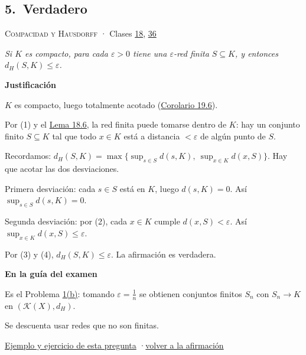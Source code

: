 \documentclass[11pt,a4paper]{article}
\providecommand{\lt}{<}\providecommand{\gt}{>}
\newcommand{\bloque}[1]{\par\smallskip\noindent\textbf{\color{acento}#1}\par}
\begin{document}
\subsection*{\hypertarget{r-5}{}5.\ \textcolor{ok}{Verdadero}}
{\small \textsc{Compacidad y Hausdorff} · Clases \href{https://decostruttivismo.github.io/MAT2514-repaso/pdf/MAT2514_apuntes_completos.pdf\#nameddest=section.18}{18}, \href{https://decostruttivismo.github.io/MAT2514-repaso/pdf/MAT2514_apuntes_completos.pdf\#nameddest=section.36}{36}}\par
\emph{Si $K$ es compacto, para cada $\varepsilon\gt 0$ tiene una $\varepsilon$-red finita $S\subseteq K$, y entonces $d_H(S,K)\le\varepsilon$.}
\bloque{Justificación}
\begin{pasos}
\item[(1)] $K$ es compacto, luego totalmente acotado (\href{https://decostruttivismo.github.io/MAT2514-repaso/pdf/MAT2514_apuntes_completos.pdf\#nameddest=teorema.19.6}{Corolario 19.6}).
\item[(2)] Por (1) y el \href{https://decostruttivismo.github.io/MAT2514-repaso/pdf/MAT2514_apuntes_completos.pdf\#nameddest=teorema.18.6}{Lema 18.6}, la red finita puede tomarse dentro de $K$: hay un conjunto finito $S\subseteq K$ tal que todo $x\in K$ está a distancia $\lt \varepsilon$ de algún punto de $S$.
\item[] Recordamos: $d_H(S,K)=\max\bigl\{\sup_{s\in S}d(s,K),\ \sup_{x\in K}d(x,S)\bigr\}$. Hay que acotar las dos desviaciones.
\item[(3)] Primera desviación: cada $s\in S$ está en $K$, luego $d(s,K)=0$. Así $\sup_{s\in S}d(s,K)=0$.
\item[(4)] Segunda desviación: por (2), cada $x\in K$ cumple $d(x,S)\lt \varepsilon$. Así $\sup_{x\in K}d(x,S)\le\varepsilon$.
\item[] Por (3) y (4), $d_H(S,K)\le\varepsilon$. La afirmación es verdadera.
\end{pasos}
\bloque{En la guía del examen}
\begin{pasos}
\item[] Es el Problema \hyperlink{prob-1}{1(b)}: tomando $\varepsilon=\frac1n$ se obtienen conjuntos finitos $S_n$ con $S_n\to K$ en $(\mathcal K(X),d_H)$.
\item[] Se descuenta usar redes que no son finitas.
\end{pasos}
\par{}
\par{\small \hyperlink{e-5}{Ejemplo y ejercicio de esta pregunta} \quad·\quad \hyperlink{q-5}{volver a la afirmación}}
\end{document}
